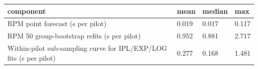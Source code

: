 \begin{tabular}{llll}
\hline
component & mean & median & max \\
\hline
RPM point forecast (s per pilot) & 0.019 & 0.017 & 0.117 \\
RPM 50 group-bootstrap refits (s per pilot) & 0.952 & 0.881 & 2.717 \\
Within-pilot sub-sampling curve for IPL/EXP/LOG fits (s per pilot) & 0.277 & 0.168 & 1.481 \\
\hline
\end{tabular}
